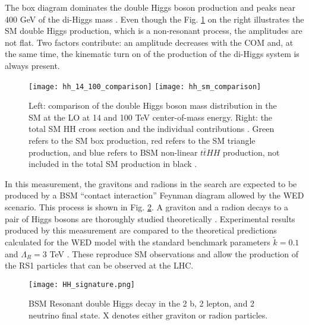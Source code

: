 The box diagram dominates the double Higgs boson production and peaks near 400 GeV of the di-Higgs mass \cite{Chen:2014xra}. Even though the Fig. \ref{hh_comparison} on the right illustrates the SM double Higgs production, which is a non-resonant process, the amplitudes are not flat. Two factors contribute: an amplitude decreases with the COM and, at the same time, the kinematic turn on of the production of the di-Higgs system is always present. 



\begin{figure}[H]
  \centering 
    \texttt{[image: hh\_14\_100\_comparison]}
    \texttt{[image: hh\_sm\_comparison]}
    \caption[Double Higgs mass distribution and the total cross-section]{Left: comparison of the double Higgs boson mass distribution in the SM at the LO at 14 and 100 TeV center-of-mass energy. Right: the total SM HH cross section and the individual contributions \cite{Contino:2012xk}. Green refers to the SM box production, red refers to the SM triangle production, and blue refers to BSM non-linear $t\bar{t}HH$ production, not included in the total SM production in black \cite{Chen:2014xra}. }
    \label{hh_comparison}
\end{figure}




In this measurement, the gravitons and radions in the search are expected to be produced by a BSM ``contact interaction'' Feynman diagram allowed by the WED scenario. This process is shown in Fig. \ref{HH_signature}.  A graviton and a radion decays to a pair of Higgs bosons are thoroughly studied theoretically \cite{Chen:2014xra, HHXsec, Contino:2012xk}. Experimental results produced by this measurement are compared to the theoretical predictions calculated for the WED model with the standard benchmark parameters $\tilde{k}=0.1$ and $\Lambda_R = 3 $ TeV \cite{Wertz:2632195, Cadamuro:2292733}. These reproduce SM observations and allow the production of the RS1 particles that can be observed at the LHC. 





\begin{figure}[H]
  \centering
    \texttt{[image: HH\_signature.png]}
    \caption[BSM Resonant double Higgs decay in the 2 b, 2 lepton, and 2 neutrino final state.]{BSM Resonant double Higgs decay in the 2 b, 2 lepton, and 2 neutrino final state. X denotes either graviton or radion particles. }
    \label{HH_signature}
\end{figure}




